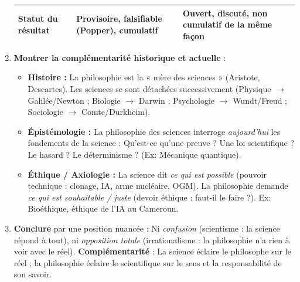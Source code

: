 \documentclass[11pt]{article}
\newcommand{\cle}[1]{{\popxbold\color{popdark}#1}}
\begin{document}
\begin{methode}
\begin{enumerate}
\begin{center}
\begin{tabularx}{\linewidth}{|l|X|X|}
    \textbf{Statut du résultat} & Provisoire, falsifiable (Popper), cumulatif & Ouvert, discuté, non cumulatif de la même façon \\ \hline
    \end{tabularx}
    \end{center}
\item \textbf{Montrer la complémentarité historique et actuelle} :
    \begin{itemize}
    \item \textbf{Histoire :} La philosophie est la « \cle{mère des sciences} » (Aristote, Descartes). Les sciences se sont détachées successivement (Physique $\rightarrow$ Galilée/Newton ; Biologie $\rightarrow$ Darwin ; Psychologie $\rightarrow$ Wundt/Freud ; Sociologie $\rightarrow$ Comte/Durkheim).
    \item \textbf{Épistémologie :} La philosophie des sciences interroge \emph{aujourd'hui} les fondements de la science : Qu'est-ce qu'une preuve ? Une loi scientifique ? Le hasard ? Le déterminisme ? (Ex: Mécanique quantique).
    \item \textbf{Éthique / Axiologie :} La science dit \emph{ce qui est possible} (pouvoir technique : clonage, IA, arme nucléaire, OGM). La philosophie demande \emph{ce qui est souhaitable / juste} (devoir éthique : faut-il le faire ?). Ex: Bioéthique, éthique de l'IA au Cameroun.
    \end{itemize}
\item \textbf{Conclure} par une position nuancée : Ni \emph{confusion} (scientisme : la science répond à tout), ni \emph{opposition totale} (irrationalisme : la philosophie n'a rien à voir avec le réel). \textbf{Complémentarité} : La science éclaire le philosophe sur le réel ; la philosophie éclaire le scientifique sur le sens et la responsabilité de son savoir.
\end{enumerate}
\end{methode}
\end{document}
